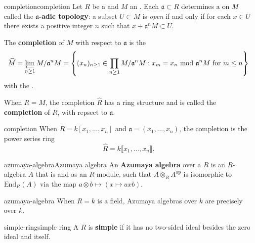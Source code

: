 \begin{topic}{completion}{completion}
    Let $R$ be a  and $M$ an . Each  $\mathfrak{a} \subset R$ determines a  on $M$ called the \textbf{$\mathfrak{a}$-adic topology}: a subset $U \subset M$ is \textit{open} if and only if for each $x \in U$ there exists a positive integer $n$ such that $x + \mathfrak{a}^n M \subset U$.
    
    The \textbf{completion} of $M$ with respect to $\mathfrak{a}$ is the 
    \[ \widehat{M} = \varprojlim_{n \ge 1} M / \mathfrak{a}^n M = \left\{ (x_n)_{n \ge 1} \in \prod_{n \ge 1} M / \mathfrak{a}^n M : x_m = x_n \text{ mod } \mathfrak{a}^n M \text{ for } m \le n \right\} \]
    with the  .
    
    When $R = M$, the completion $\widehat{R}$ has a ring structure and is called the \textbf{completion} of $R$, with repsect to $\mathfrak{a}$.
\end{topic}

\begin{example}{completion}
    When $R = k[x_1, \ldots, x_n]$ and $\mathfrak{a} = (x_1, \ldots, x_n)$, the completion is the power series ring
    \[ \widehat{R} = k\llbracket x_1, \ldots, x_n \rrbracket . \]
\end{example}

\begin{topic}{azumaya-algebra}{Azumaya algebra}
    An \textbf{Azumaya algebra} over a  $R$ is an $R$-algebra $A$ that is   and  as an $R$-module, such that $A \otimes_R A^\text{op}$ is isomorphic to $\text{End}_R(A)$ via the map $a \otimes b \mapsto (x \mapsto axb)$.
\end{topic}

\begin{example}{azumaya-algebra}
    When $R = k$ is a field, Azumaya algebras over $k$ are precisely  over $k$.
\end{example}

\begin{topic}{simple-ring}{simple ring}
    A  $R$ is \textbf{simple} if it has no two-sided ideal besides the zero ideal and itself.
\end{topic}

